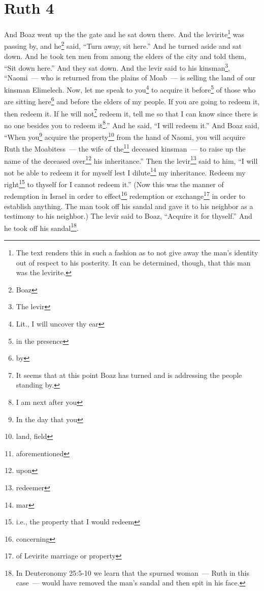 \section{Ruth 4}\label{Ruth 4}
\begin{enumerate}[align=center]
     And Boaz went up the the gate and he sat down there. And the levirite\footnote{The text renders this in such a fashion as to not give away the man's identity out of respect to his posterity. It can be determined, though, that this man was the levirite.} was passing by, and he\footnote{Boaz} said, ``Turn away, sit here.'' And he turned aside and sat down.%
     And he took ten men from among the elders of the city and told them, ``Sit down here.'' And they sat down.%
     And the levir said to his kinsman\footnote{The levir}, ``Naomi~--- who is returned from the plains of Moab~--- is selling the land of our kinsman Elimelech.%
     Now, let me speak to you\footnote{Lit., I will uncover thy ear} to acquire it before\footnote{in the presence} of those who are sitting here\footnote{by} and before the elders of my people. If you are going to redeem it, then redeem it. If he will not\footnote{It seems that at this point Boaz has turned and is addressing the people standing by.} redeem it, tell me so that I can know since there is no one besides you to redeem it\footnote{I am next after you}.'' And he said, ``I will redeem it.''%
     And Boaz said, ``When you\footnote{In the day that you} acquire the property\footnote{land, field} from the hand of Naomi, you will acquire Ruth the Moabitess~--- the wife of the\footnote{aforementioned} deceased kinsman~--- to raise up the name of the deceased over\footnote{upon} his inheritance.''%
     Then the levir\footnote{redeemer} said to him, ``I will not be able to redeem it for myself lest I dilute\footnote{mar} my inheritance. Redeem my right\footnote{i.e., the property that I would redeem} to thyself for I cannot redeem it.''%
     (Now this was the manner of redemption in Israel in order to effect\footnote{concerning} redemption or exchange\footnote{of Levirite marriage or property} in order to establish anything. The man took off his sandal and gave it to his neighbor as a testimony to his neighbor.)%
     The levir said to Boaz, ``Acquire it for thyself.'' And he took off his sandal\footnote{In Deuteronomy 25:5-10 we learn that the spurned woman~--- Ruth in this case~--- would have removed the man's sandal and then spit in his face.}.%

\end{enumerate}

